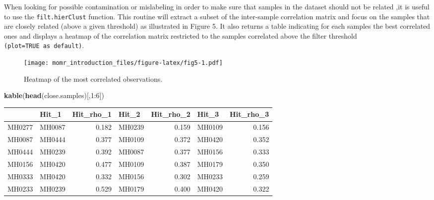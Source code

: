 \documentclass[]{article}
\newenvironment{Shaded}{\begin{snugshade}}{\end{snugshade}}
\newcommand{\KeywordTok}[1]{\textcolor[rgb]{0.13,0.29,0.53}{\textbf{{#1}}}}
\newcommand{\DataTypeTok}[1]{\textcolor[rgb]{0.13,0.29,0.53}{{#1}}}
\newcommand{\DecValTok}[1]{\textcolor[rgb]{0.00,0.00,0.81}{{#1}}}
\newcommand{\FloatTok}[1]{\textcolor[rgb]{0.00,0.00,0.81}{{#1}}}
\newcommand{\StringTok}[1]{\textcolor[rgb]{0.31,0.60,0.02}{{#1}}}
\newcommand{\CommentTok}[1]{\textcolor[rgb]{0.56,0.35,0.01}{\textit{{#1}}}}
\newcommand{\OtherTok}[1]{\textcolor[rgb]{0.56,0.35,0.01}{{#1}}}
\newcommand{\NormalTok}[1]{{#1}}
\begin{document}
When looking for possible contamination or mislabeling in order to make
sure that samples in the dataset should not be related ,it is useful to
use the \texttt{filt.hierClust} function. This routine will extract a
subset of the inter-sample correlation matrix and focus on the samples
that are closely related (above a given threshold) as illustrated in
Figure 5. It also returns a table indicating for each samples the best
correlated ones and displays a heatmap of the correlation matrix
restricted to the samples correlated above the filter threshold
\texttt{(plot=TRUE\ as\ default)}.

\begin{Shaded}
\end{Shaded}

\begin{figure}[htbp]
\centering
\texttt{[image: momr\_introduction\_files/figure-latex/fig5-1.pdf]}
\caption{Heatmap of the most correlated observations.}
\end{figure}

\begin{Shaded}
\begin{Highlighting}[]
\KeywordTok{kable}\NormalTok{(}\KeywordTok{head}\NormalTok{(close.samples)[,}\DecValTok{1}\NormalTok{:}\DecValTok{6}\NormalTok{])}
\end{Highlighting}
\end{Shaded}

\begin{longtable}[c]{@{}llrlrlr@{}}
\toprule
& Hit\_1 & Hit\_rho\_1 & Hit\_2 & Hit\_rho\_2 & Hit\_3 &
Hit\_rho\_3\tabularnewline
\midrule
\endhead
MH0277 & MH0087 & 0.182 & MH0239 & 0.159 & MH0109 & 0.156\tabularnewline
MH0087 & MH0444 & 0.377 & MH0109 & 0.372 & MH0420 & 0.352\tabularnewline
MH0444 & MH0239 & 0.392 & MH0087 & 0.377 & MH0156 & 0.333\tabularnewline
MH0156 & MH0420 & 0.477 & MH0109 & 0.387 & MH0179 & 0.350\tabularnewline
MH0333 & MH0420 & 0.332 & MH0156 & 0.302 & MH0233 & 0.259\tabularnewline
MH0233 & MH0239 & 0.529 & MH0179 & 0.400 & MH0420 & 0.322\tabularnewline
\bottomrule
\end{longtable}
\end{document}
